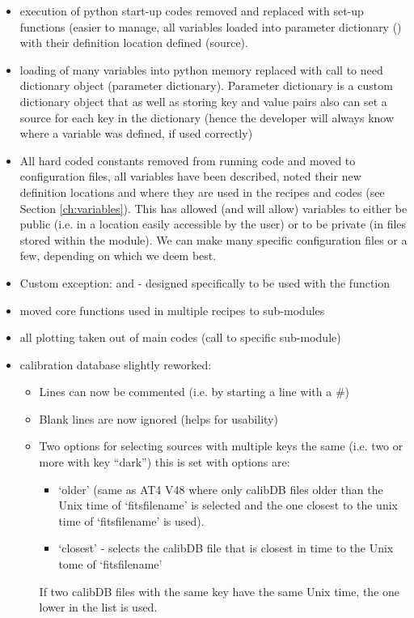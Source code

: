 \begin{itemize}
\begin{itemize}
	\end{itemize}
\item execution of python start-up codes removed and replaced with set-up functions (easier to manage, all variables loaded into parameter dictionary (\ParamDict) with their definition location defined (source).

\item loading of many variables into python memory replaced with call to need dictionary object (parameter dictionary). Parameter dictionary is a custom dictionary object that as well as storing key and value pairs also can set a source for each key in the dictionary (hence the developer will always know where a variable was defined, if used correctly)

\item All hard coded constants removed from running code and moved to configuration files, all variables have been described, noted their new definition locations and where they are used in the recipes and codes (see Section \ref{ch:variables}). This has allowed (and will allow) variables to either be public (i.e. in a location easily accessible by the user) or to be private (in files stored within the module). We can make many specific configuration files or a few, depending on which we deem best.

\item Custom exception: \ConfigError and  - designed specifically to be used with the \WLOG function 

\item moved core functions used in multiple recipes to sub-modules

\item all plotting taken out of main codes (call to specific sub-module)

\item calibration database slightly reworked:

\begin{itemize}
	\item Lines can now be commented (i.e. by starting a line with a \#)
	\item Blank lines are now ignored (helps for usability)
	\item Two options for selecting sources with multiple keys the same (i.e. two or more with key ``dark'') this is set with  options are:

	\begin{itemize}
		\item `older' (same as AT4 V48 where only calibDB files older than the Unix time of `fitsfilename' is selected and the one closest to the unix time of `fitsfilename' is used).
		\item `closest' - selects the calibDB file that is closest in time to the Unix tome of `fitsfilename'
	\end{itemize}
	\begin{note}
	If two calibDB files with the same key have the same Unix time, the one lower in the list is used.
	\end{note}


\end{itemize}
\end{itemize}
